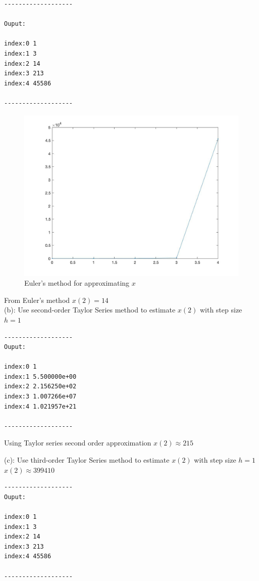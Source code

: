 \documentclass{article}
\begin{document}
\begin{verbatim}
-------------------

Ouput:

index:0 1
index:1 3
index:2 14
index:3 213
index:4 45586

-------------------
\end{verbatim}

\begin{figure}
  \includegraphics[width=\linewidth]{docs/euler.jpg}
  \caption{Euler's method for approximating $x$}
  \label{fig:boat1}
\end{figure}

From Euler's method $ x(2) = 14$ \\


(b): Use second-order Taylor Series method to estimate $x(2)$ with step size $h = 1$



\begin{verbatim}
-------------------
Ouput:

index:0 1
index:1 5.500000e+00
index:2 2.156250e+02
index:3 1.007266e+07
index:4 1.021957e+21

-------------------
\end{verbatim}

\noindent
Using Taylor series second order approximation $x(2) \approx 215$\\


\noindent

(c): Use third-order Taylor Series method to estimate $x(2)$ with step size  $ h = 1$ \\
$ x(2) \approx  399410 $




\begin{verbatim}
-------------------
Ouput:

index:0 1
index:1 3
index:2 14
index:3 213
index:4 45586

-------------------
\end{verbatim}
\end{document}
